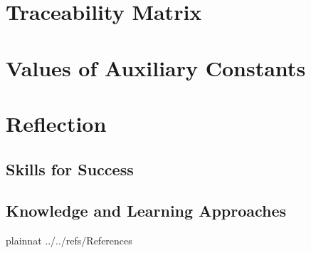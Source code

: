 \documentclass[12pt]{article}
\begin{document}
\section{Traceability Matrix}

\appendix
\section{Values of Auxiliary Constants}

\newpage

\appendix
\section{Reflection}
\subsection{Skills for Success}
\subsection{Knowledge and Learning Approaches}

 {plainnat}
 {../../refs/References}
\end{document}
